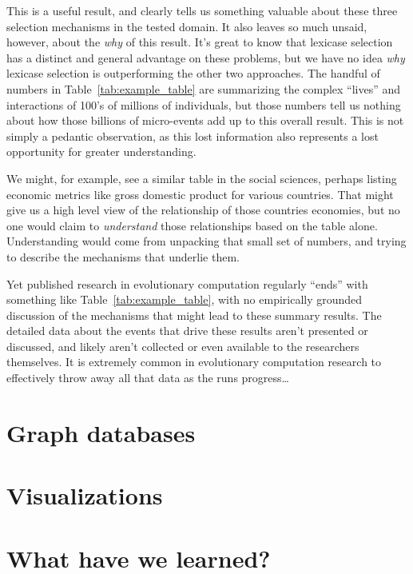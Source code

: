 This is a useful result, and clearly tells us something valuable about
these three selection mechanisms in the tested domain. It also leaves
so much unsaid, however, about the \emph{why} of this result. It's great
to know that lexicase selection has a distinct and general advantage on 
these problems, but we have no idea \emph{why} lexicase selection is
outperforming the other two approaches. The handful of numbers in
Table~\ref{tab:example_table} are summarizing the complex ``lives'' 
and interactions of 100's of millions of individuals, but those numbers
tell us nothing about how those billions of micro-events add up to this
overall result. This is not simply a pedantic observation, as this lost 
information also represents a lost opportunity for greater understanding. 

We might, for example, see a similar table in the social sciences, 
perhaps listing economic metrics like gross domestic product for 
various countries. That might give us a high level view of the relationship
of those countries economies, but no one would claim to \emph{understand}
those relationships based on the table alone. Understanding would come
from unpacking that small set of numbers, and trying to describe the
mechanisms that underlie them. 

Yet published research in evolutionary
computation regularly ``ends'' with something like 
Table~\ref{tab:example_table}, with no empirically grounded discussion 
of the mechanisms that might lead to these summary results. The detailed
data about the events that drive these results aren't presented or discussed,
and likely aren't collected or even available to the researchers themselves.
It is extremely common in evolutionary computation research to effectively
throw away all that data as the runs progress\ldots
{}


\section{Graph databases}
\label{sec:graph_DBs}

\section{Visualizations}
\label{sec:visualizations}

\section{What have we learned?}
\label{sec:learned}

